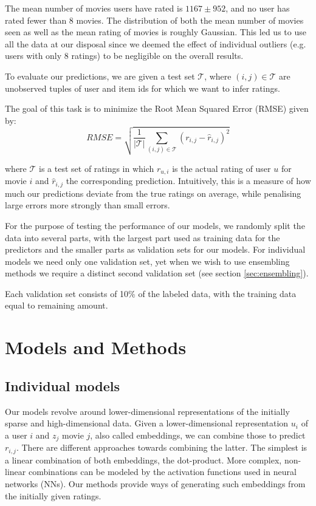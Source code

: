 \documentclass[10pt,conference,compsocconf]{IEEEtran}
\begin{document}
The mean number of movies users have rated is \(1167\pm 952\), and no user has rated fewer than 8 movies. The distribution of both the mean number of movies seen as well as the mean rating of movies is roughly Gaussian. %
This led us to use all the data at our disposal since we deemed the effect of individual outliers (e.g. users with only 8 ratings) to be negligible on the overall results.


To evaluate our predictions, we are given a test set $\mathcal{T}$, where $(i,j) \in \mathcal{T}$ are unobserved tuples of user and item ids for which we want to infer ratings.

The goal of this task is to minimize the Root Mean Squared Error (RMSE) given by:
\begin{equation}
RMSE = \sqrt{\frac{1}{|\mathcal{T}|}\sum_{(i, j) \in \mathcal{T}} (r_{i,j} -\widehat{r}_{i,j})^2}
\end{equation}

where $\mathcal{T}$ is a test set of ratings in which $r_{u, i}$ is the actual rating of user $u$ for movie $i$ and $\widehat{r}_{i,j}$ the corresponding prediction.
Intuitively, this is a measure of how much our predictions deviate from the true ratings on average, while penalising large errors more strongly than small errors.

For the purpose of testing the performance of our models, we randomly split the data into several parts, with the largest part used as training data for the predictors and the smaller parts as validation sets for our models. For individual models we need only one validation set, yet when we wish to use ensembling methods we require a distinct second validation set (see section \ref{sec:ensembling}).

Each validation set consists of 10\% of the labeled data, with the training data equal to remaining amount.

\section{Models and Methods}
\label{sec:methods}
\subsection{Individual models}
Our models revolve around lower-dimensional representations of the initially sparse and high-dimensional data. Given a lower-dimensional representation $u_i$ of a user $i$ and $z_j$ movie $j$, also called embeddings, we can combine those to predict $r_{i,j}$. There are different approaches towards combining the latter. The simplest is a linear combination of both embeddings, the dot-product. More complex, non-linear combinations can be modeled by the activation functions used in neural networks (NNs). Our methods provide ways of generating such embeddings from the initially given ratings.
\end{document}

